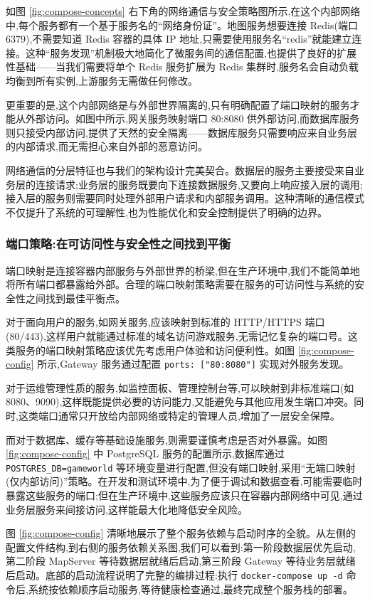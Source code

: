 如图 \ref{fig:compose-concepts} 右下角的网络通信与安全策略图所示,在这个内部网络中,每个服务都有一个基于服务名的``网络身份证''。地图服务想要连接 Redis(端口 6379),不需要知道 Redis 容器的具体 IP 地址,只需要使用服务名``redis''就能建立连接。这种``服务发现''机制极大地简化了微服务间的通信配置,也提供了良好的扩展性基础——当我们需要将单个 Redis 服务扩展为 Redis 集群时,服务名会自动负载均衡到所有实例,上游服务无需做任何修改。

更重要的是,这个内部网络是与外部世界隔离的,只有明确配置了端口映射的服务才能从外部访问。如图中所示,网关服务映射端口 80:8080 供外部访问,而数据库服务则只接受内部访问,提供了天然的安全隔离——数据库服务只需要响应来自业务层的内部请求,而无需担心来自外部的恶意访问。

网络通信的分层特征也与我们的架构设计完美契合。数据层的服务主要接受来自业务层的连接请求;业务层的服务既要向下连接数据服务,又要向上响应接入层的调用;接入层的服务则需要同时处理外部用户请求和内部服务调用。这种清晰的通信模式不仅提升了系统的可理解性,也为性能优化和安全控制提供了明确的边界。

\subsubsection{端口策略:在可访问性与安全性之间找到平衡}

端口映射是连接容器内部服务与外部世界的桥梁,但在生产环境中,我们不能简单地将所有端口都暴露给外部。合理的端口映射策略需要在服务的可访问性与系统的安全性之间找到最佳平衡点。

对于面向用户的服务,如网关服务,应该映射到标准的 HTTP/HTTPS 端口(80/443),这样用户就能通过标准的域名访问游戏服务,无需记忆复杂的端口号。这类服务的端口映射策略应该优先考虑用户体验和访问便利性。如图 \ref{fig:compose-config} 所示,Gateway 服务通过配置 \texttt{ports: ["80:8080"]} 实现对外服务发现。

对于运维管理性质的服务,如监控面板、管理控制台等,可以映射到非标准端口(如 8080、9090),这样既能提供必要的访问能力,又能避免与其他应用发生端口冲突。同时,这类端口通常只开放给内部网络或特定的管理人员,增加了一层安全保障。

而对于数据库、缓存等基础设施服务,则需要谨慎考虑是否对外暴露。如图 \ref{fig:compose-config} 中 PostgreSQL 服务的配置所示,数据库通过 \texttt{POSTGRES\_DB=gameworld} 等环境变量进行配置,但没有端口映射,采用``无端口映射(仅内部访问)''策略。在开发和测试环境中,为了便于调试和数据查看,可能需要临时暴露这些服务的端口;但在生产环境中,这些服务应该只在容器内部网络中可见,通过业务层服务来间接访问,这样能最大化地降低安全风险。

图 \ref{fig:compose-config} 清晰地展示了整个服务依赖与启动时序的全貌。从左侧的配置文件结构,到右侧的服务依赖关系图,我们可以看到:第一阶段数据层优先启动,第二阶段 MapServer 等待数据层就绪后启动,第三阶段 Gateway 等待业务层就绪后启动。底部的启动流程说明了完整的编排过程:执行 \texttt{docker-compose up -d} 命令后,系统按依赖顺序启动服务,等待健康检查通过,最终完成整个服务栈的部署。

